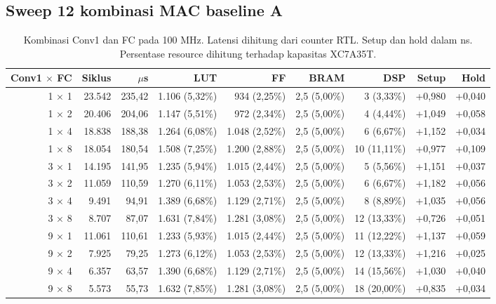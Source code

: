 \documentclass[11pt,a4paper]{article}
\begin{document}
\subsection{Sweep 12 kombinasi MAC baseline A}
\begin{table}[H]
\centering\small
\setlength{\tabcolsep}{3pt}
\caption{Kombinasi Conv1 dan FC pada 100 MHz. Latensi dihitung dari counter RTL. Setup dan hold dalam ns. Persentase resource dihitung terhadap kapasitas XC7A35T.}
\begin{tabular}{rrrrrrrrr}
\toprule
Conv1 $\times$ FC & Siklus & $\mu$s & LUT & FF & BRAM & DSP & Setup & Hold \\
\midrule
1 $\times$ 1 & 23.542 & 235,42 & 1.106 (5,32\%) & 934 (2,25\%) & 2,5 (5,00\%) & 3 (3,33\%) & +0,980 & +0,040 \\
1 $\times$ 2 & 20.406 & 204,06 & 1.147 (5,51\%) & 972 (2,34\%) & 2,5 (5,00\%) & 4 (4,44\%) & +1,049 & +0,058 \\
1 $\times$ 4 & 18.838 & 188,38 & 1.264 (6,08\%) & 1.048 (2,52\%) & 2,5 (5,00\%) & 6 (6,67\%) & +1,152 & +0,034 \\
1 $\times$ 8 & 18.054 & 180,54 & 1.508 (7,25\%) & 1.200 (2,88\%) & 2,5 (5,00\%) & 10 (11,11\%) & +0,977 & +0,109 \\
3 $\times$ 1 & 14.195 & 141,95 & 1.235 (5,94\%) & 1.015 (2,44\%) & 2,5 (5,00\%) & 5 (5,56\%) & +1,151 & +0,037 \\
3 $\times$ 2 & 11.059 & 110,59 & 1.270 (6,11\%) & 1.053 (2,53\%) & 2,5 (5,00\%) & 6 (6,67\%) & +1,182 & +0,056 \\
3 $\times$ 4 & 9.491 & 94,91 & 1.389 (6,68\%) & 1.129 (2,71\%) & 2,5 (5,00\%) & 8 (8,89\%) & +1,035 & +0,056 \\
3 $\times$ 8 & 8.707 & 87,07 & 1.631 (7,84\%) & 1.281 (3,08\%) & 2,5 (5,00\%) & 12 (13,33\%) & +0,726 & +0,051 \\
9 $\times$ 1 & 11.061 & 110,61 & 1.233 (5,93\%) & 1.015 (2,44\%) & 2,5 (5,00\%) & 11 (12,22\%) & +1,137 & +0,059 \\
9 $\times$ 2 & 7.925 & 79,25 & 1.273 (6,12\%) & 1.053 (2,53\%) & 2,5 (5,00\%) & 12 (13,33\%) & +1,216 & +0,025 \\
9 $\times$ 4 & 6.357 & 63,57 & 1.390 (6,68\%) & 1.129 (2,71\%) & 2,5 (5,00\%) & 14 (15,56\%) & +1,030 & +0,040 \\
9 $\times$ 8 & 5.573 & 55,73 & 1.632 (7,85\%) & 1.281 (3,08\%) & 2,5 (5,00\%) & 18 (20,00\%) & +0,835 & +0,034 \\
\bottomrule
\end{tabular}
\end{table}
\end{document}
